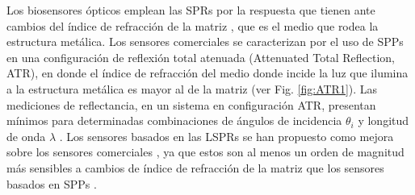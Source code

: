 Los biosensores ópticos emplean las SPRs por la respuesta que tienen ante cambios del índice de refracción de la matriz \cite{kabashin2009plasmonic}, que es el medio que rodea la estructura metálica.  Los sensores comerciales se caracterizan por el uso de SPPs \cite{estevez2014trends} en una configuración de reflexión total atenuada (Attenuated Total Reflection, ATR), en donde el índice de refracción del medio donde incide la luz que ilumina a la estructura metálica es mayor al de la matriz (ver Fig.  \ref{fig:ATR1}).  Las mediciones de reflectancia, en un sistema en configuración ATR, presentan mínimos para determinadas combinaciones de  ángulos de incidencia $\theta_i$ y longitud de onda $\lambda$  \cite{danilov2018ultra}.  Los sensores basados en las LSPRs se han propuesto como mejora sobre los sensores comerciales \cite{estevez2014trends}, ya que estos son al menos un orden de magnitud más sensibles a cambios de índice de refracción de la matriz  que los sensores basados en SPPs \cite{jain2008noble,kabashin2009plasmonic}. \\


